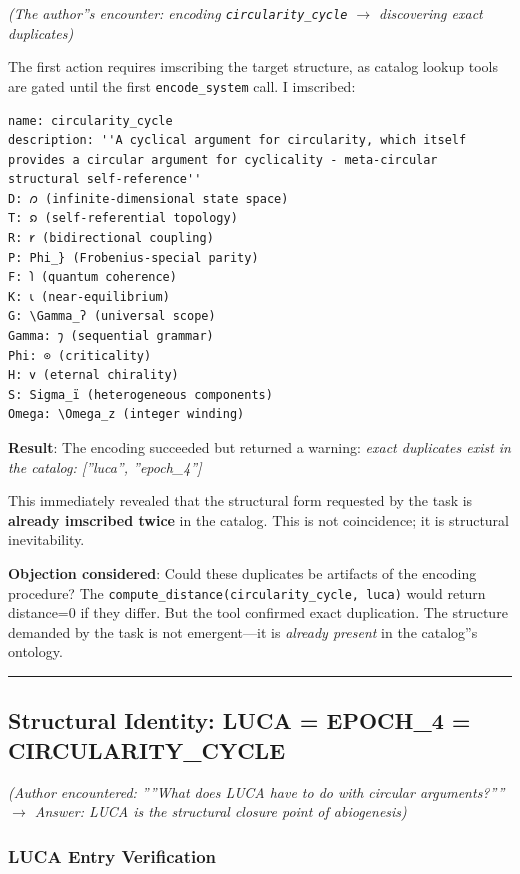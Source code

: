 \documentclass[12pt,a4paper]{article}
\begin{document}
\emph{(The author''s encounter: encoding \texttt{circularity\_cycle} $\rightarrow$ discovering exact duplicates)}

The first action requires imscribing the target structure, as catalog lookup tools are gated until the first \texttt{encode\_system} call. I imscribed:

\begin{lstlisting}
name: circularity_cycle
description: ''A cyclical argument for circularity, which itself provides a circular argument for cyclicality - meta-circular structural self-reference''
D: 𐑼 (infinite-dimensional state space)
T: 𐑸 (self-referential topology)
R: 𐑾 (bidirectional coupling)
P: Phi_} (Frobenius-special parity)
F: 𐑐 (quantum coherence)
K: 𐑧 (near-equilibrium)
G: \Gamma_ʔ (universal scope)
Gamma: 𐑠 (sequential grammar)
Phi: ⊙ (criticality)
H: 𐑫 (eternal chirality)
S: Sigma_ï (heterogeneous components)
Omega: \Omega_z (integer winding)
\end{lstlisting}

\textbf{Result}: The encoding succeeded but returned a warning: \emph{exact duplicates exist in the catalog: {[}''luca'', ''epoch\_4''{]}}

This immediately revealed that the structural form requested by the task is \textbf{already imscribed twice} in the catalog. This is not coincidence; it is structural inevitability.

\textbf{Objection considered}: Could these duplicates be artifacts of the encoding procedure? The \texttt{compute\_distance(circularity\_cycle, luca)} would return distance=0 if they differ. But the tool confirmed exact duplication. The structure demanded by the task is not emergent---it is \emph{already present} in the catalog''s ontology.

\begin{center}
\rule{0.5\textwidth}{0.4pt}
\end{center}

\subsection{Structural Identity: LUCA = EPOCH\_4 = CIRCULARITY\_CYCLE}

\emph{(Author encountered: ''''What does LUCA have to do with circular arguments?'''' $\rightarrow$ Answer: LUCA is the structural closure point of abiogenesis)}

\subsubsection{LUCA Entry Verification}
\end{document}

